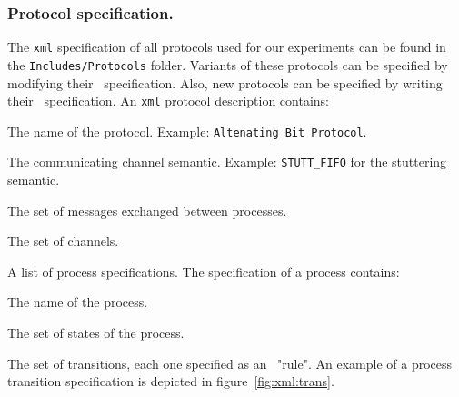 \subsubsection*{Protocol specification.}

The \texttt{xml} specification of all protocols used for our experiments can be found in the \texttt{Includes/Protocols} folder.
%
Variants of these protocols can be specified by modifying their \xml\ specification.
Also, new protocols can be specified by writing their \xml\ specification.
%
An \texttt{xml} protocol description contains:
\begin{inparaenum}
\item The name of the protocol. Example: \texttt{Altenating Bit Protocol}.
\item The communicating channel semantic. Example: \texttt{STUTT\_FIFO} for the stuttering semantic.
\item The set of messages exchanged between processes.
\item The set of channels.
\item A list of process specifications. The specification of a process contains:
\begin{inparaenum}
\item The name of the process.
\item The set of states of the process.
\item The set of transitions, each one specified as an \Xml\ "rule". An example of a process transition specification is depicted in figure~\ref{fig:xml:trans}.
\end{inparaenum}
\end{inparaenum}

